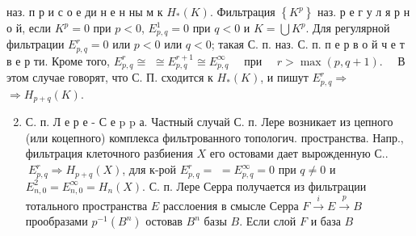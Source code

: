 \documentclass[10pt]{article}
\begin{document}
наз. п р и с о е ди н е н ны м к $H_{*}(K)$. Фильтрация $\left\{K^{p}\right\}$ наз. р е г у л я р н о й, если $K^{p}=0$ при $p<0$, $E_{p, q}^{1}=0$ при $q<0$ и $K=\bigcup K^{p}$. Для регулярной фильтрации $E_{p, q}^{r}=0$ или $p<0$ или $q<0$; такая С. п. наз. С. п. п е р в о й ч е т в е р ти. Кроме того, $E_{p, q}^{r} \cong$ $\cong E_{p, q}^{r+1} \cong E_{p, q}^{\infty} \quad$ при $\quad r>\max (p, q+1) . \quad$ В этом случае говорят, что С. П. сходится к $H_{*}(K)$, и пишут $E_{p, q}^{r} \Rightarrow$ $\Rightarrow H_{p+q}(K)$.



\begin{enumerate}

  \setcounter{enumi}{1}

  \item С. п. Л е р е - С е p p а. Частный случай С. п. Лере возникает из цепного (или коцепного) комплекса фильтрованного топологич. пространства. Напр., фильтрация клеточного разбиения $X$ его остовами дает вырожденную С..$~ E_{p, q}^{r} \Rightarrow H_{p+q}(X)$, для к-рой $E_{p, q}^{r}=$ $=E_{p, q}^{\infty}=0$ при $q \neq 0$ и $E_{n, 0}^{2}=E_{n, 0}^{\infty}=H_{n}(X)$. С. п. Лере Серра получается из фильтрации тотального пространства $E$ расслоения в смысле Серра $F \stackrel{i}{\rightarrow} E \stackrel{p}{\rightarrow} B$ прообразами $p^{-1}\left(B^{n}\right)$ остовав $B^{n}$ базы $B$. Если слой $F$ и база $B$

\end{enumerate}
\end{document}
